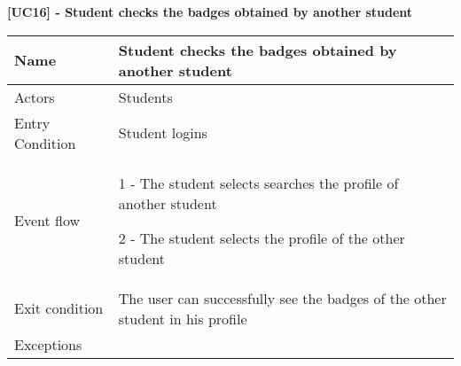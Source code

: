     \begin{table}[]
    \textbf{[UC16] - Student checks the badges obtained by another student}
    
      \centering
      \begin{tabular}{|p{3cm}|p{14cm}|}
        \hline
         Name & Student checks the badges obtained by another student \\
        \hline
        Actors & Students \\
        \hline
        Entry Condition & Student logins \\
        \hline
        Event flow &  1 - The student selects searches the profile of another student

        2 - The student selects the profile of the other student
        
        \\
        \hline
        Exit condition & The user can successfully see the badges of the other student in his profile \\
        \hline
        Exceptions &
        \\
        \hline
      \end{tabular}
      
    \end{table}